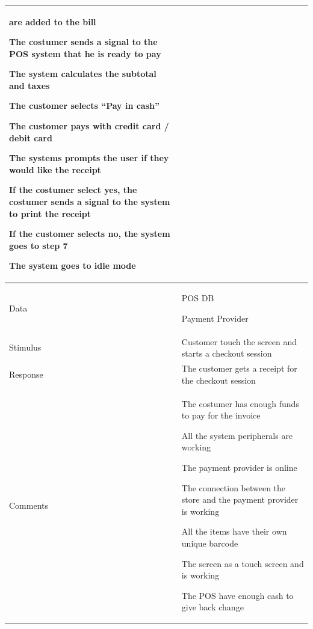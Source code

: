 \documentclass[12pt]{article}
\newenvironment{packed_enum}{
\begin{enumerate}
  \setlength{\itemsep}{0.2pt}
  \setlength{\parskip}{0pt}
  \setlength{\parsep}{0pt}
}{\end{enumerate}}
\newenvironment{packed_enum_alpha}{
\begin{enumerate}[label=\alph*.]
  \setlength{\itemsep}{0.2pt}
  \setlength{\parskip}{0pt}
  \setlength{\parsep}{0pt}
}{\end{enumerate}}
\newenvironment{packed_item}{
\begin{itemize}
  \setlength{\itemsep}{0.2pt}
  \setlength{\parskip}{0pt}
  \setlength{\parsep}{0pt}
}{\end{itemize}}
\begin{document}
\begin{longtable}{| p{} | p{} |}
\begin{packed_enum}
{            are added to the bill
            \item The costumer sends a signal to the POS system that 
            he is ready to pay
            \begin{packed_enum_alpha}
                \item The system calculates the subtotal and taxes
                \item The customer selects “Pay in cash”
                \item The customer pays with credit card / debit card
            \end{packed_enum_alpha}
            \item The systems prompts the user if they would like the receipt
            \begin{packed_enum_alpha}
                \item If the costumer select yes, the costumer sends a signal 
                to the system to print the receipt
                \item If the customer selects no, the system goes to step 7
            \end{packed_enum_alpha}
            \item The system goes to idle mode
        }
    \end{packed_enum}    \\ 
     \hline
    Data & \begin{packed_item}
        \small{
            \item POS DB
            \item Payment Provider
        }
    \end{packed_item}    \\ 
    \hline
    Stimulus & Customer touch the screen and starts a checkout session\\ 
    \hline
    Response & The customer gets a receipt for the checkout session    \\ 
    \hline
    Comments & \begin{packed_item}
        \small{
            \item The costumer has enough funds to pay for the invoice
            \item All the system peripherals are working
            \item The payment provider is online
            \item The connection between the store and the payment provider is working
            \item All the items have their own unique barcode
            \item The screen as a touch screen and is working
            \item The POS have enough cash to give back change
        }
    \end{packed_item} \\ 
    \hline
    \end{longtable}
\pagebreak
\end{document}
